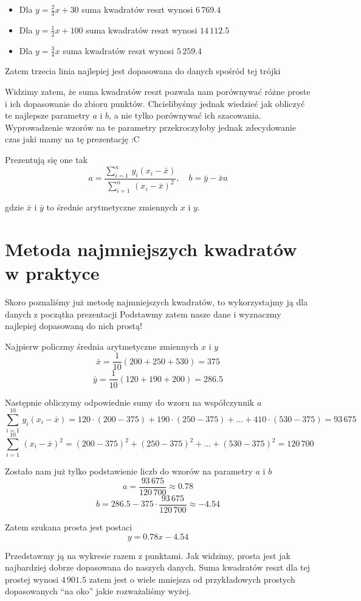 \documentclass[a4paper,12pt]{article}
\begin{document}
\begin{itemize}
	\item Dla $y = \frac23x + 30$ suma kwadratów reszt wynosi $6\,769.4$
	\item Dla $y = \frac12x + 100$  suma kwadratów reszt wynosi $14\,112.5$
	\item Dla $y = \frac34x$ suma kwadratów reszt wynosi $5\,259.4$
\end{itemize}

Zatem trzecia linia najlepiej jest dopasowana do danych spośród tej trójki

Widzimy zatem, że suma kwadratów reszt pozwala nam porównywać różne proste i ich dopasowanie do zbioru punktów. Chcielibyśmy jednak wiedzieć jak obliczyć te najlepsze parametry $a$ i $b$, a nie tylko porównywać ich szacowania. Wyprowadzenie wzorów na te parametry przekroczyłoby jednak zdecydowanie czas jaki mamy na tę prezentację :C

Prezentują się one tak
\[
	a = \frac{\sum_{i=1}^n\, y_i(x_i - \bar x)}{\sum_{i=1}^n\, (x_i - \bar x)^2}, \quad b = \bar y - \bar x a
\]

gdzie $\bar x$ i $\bar y$ to średnie arytmetyczne zmiennych $x$ i $y$.

\section{Metoda najmniejszych kwadratów w praktyce}
Skoro poznaliśmy już metodę najmniejszych kwadratów, to wykorzystajmy ją dla danych z początka prezentacji Podstawmy zatem nasze dane i wyznaczmy najlepiej dopasowaną do nich prostą!

Najpierw policzmy średnia arytmetyczne zmiennych $x$ i $y$
\[
	\bar x = \frac{1}{10} (200+250+530)=375
\]
\[
	\bar y = \frac{1}{10} (120+190+200)=286.5
\]

 Następnie obliczymy odpowiednie sumy do wzoru na współczynnik $a$
\[
	\sum_{i=1}^{10}\, y_i(x_i - \bar x) = 120 \cdot (200-375) + 190 \cdot (250-375) + ... + 410 \cdot (530-375) = 93\,675
\]
\[
	\sum_{i=1}^{10}\, (x_i - \bar x)^2 = (200-375)^2 + (250-375)^2 + ... + (530-375)^2 = 120\,700
\]

 Zostało nam już tylko podstawienie liczb do wzorów na parametry $a$ i $b$ 
\[
	a = \frac{93\,675}{120\,700} \approx 0.78
\]
\[
	b = 286.5 - 375 \cdot \frac{93\,675}{120\,700} \approx -4.54
\]

 Zatem szukana prosta jest postaci
\[
	y = 0.78x - 4.54
\]

Przedstawmy ją na wykresie razem z punktami.  Jak widzimy, prosta jest jak najbardziej dobrze dopasowana do naszych danych. Suma kwadratów reszt dla tej prostej wynosi $4\,901.5$ zatem jest o wiele mniejsza od przykładowych prostych dopasowanych “na oko” jakie rozważaliśmy wyżej.
\end{document}
